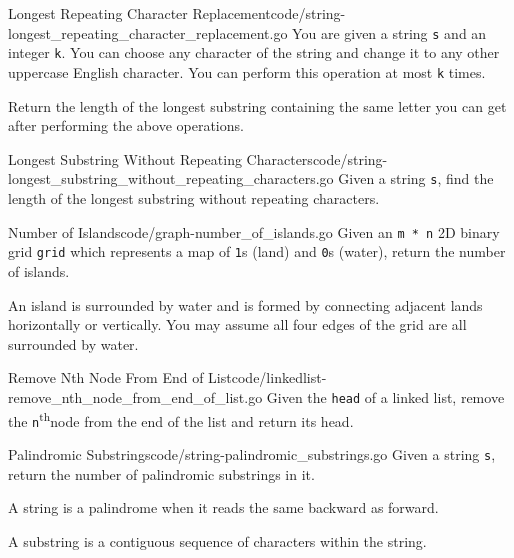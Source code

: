 \documentclass[10pt]{report}
\newcommand{\nth}[0]{\textsuperscript{th}\space}
\newcommand{\var}[1]{\texttt{#1}}
\begin{document}
\begin{problem}{Longest Repeating Character Replacement}{code/string-longest_repeating_character_replacement.go}
You are given a string \var{s} and an integer \var{k}. You can choose any character of the string and change it to any other uppercase English character. You can perform this operation at most \var{k} times.

Return the length of the longest substring containing the same letter you can get after performing the above operations.
\end{problem}

\begin{problem}{Longest Substring Without Repeating Characters}{code/string-longest_substring_without_repeating_characters.go}
Given a string \var{s}, find the length of the longest substring without repeating characters.
\end{problem}

\begin{problem}{Number of Islands}{code/graph-number_of_islands.go}
Given an \var{m * n} 2D binary grid \var{grid} which represents a map of \var{1}s (land) and \var{0}s (water), return the number of islands.

An island is surrounded by water and is formed by connecting adjacent lands horizontally or vertically. You may assume all four edges of the grid are all surrounded by water.
\end{problem}

\begin{problem}{Remove Nth Node From End of List}{code/linkedlist-remove_nth_node_from_end_of_list.go}
Given the \var{head} of a linked list, remove the \var{n}\nth node from the end of the list and return its head.
\end{problem}

\begin{problem}{Palindromic Substrings}{code/string-palindromic_substrings.go}
Given a string \var{s}, return the number of palindromic substrings in it.

A string is a palindrome when it reads the same backward as forward.

A substring is a contiguous sequence of characters within the string.
\end{problem}
\end{document}
